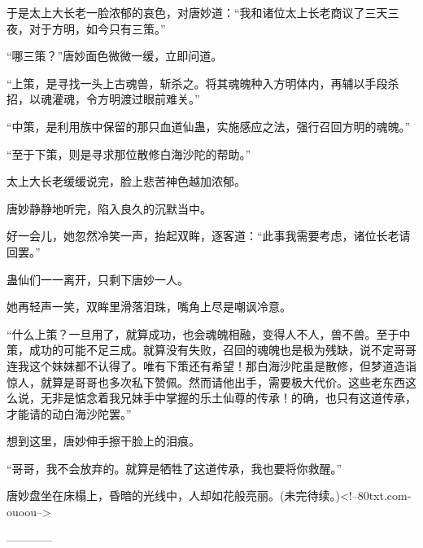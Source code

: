 \begin{this_body}
于是太上大长老一脸浓郁的哀色，对唐妙道：“我和诸位太上长老商议了三天三夜，对于方明，如今只有三策。”

“哪三策？”唐妙面色微微一缓，立即问道。

“上策，是寻找一头上古魂兽，斩杀之。将其魂魄种入方明体内，再辅以手段杀招，以魂灌魂，令方明渡过眼前难关。”

“中策，是利用族中保留的那只血道仙蛊，实施感应之法，强行召回方明的魂魄。”

“至于下策，则是寻求那位散修白海沙陀的帮助。”

太上大长老缓缓说完，脸上悲苦神色越加浓郁。

唐妙静静地听完，陷入良久的沉默当中。

好一会儿，她忽然冷笑一声，抬起双眸，逐客道：“此事我需要考虑，诸位长老请回罢。”

蛊仙们一一离开，只剩下唐妙一人。

她再轻声一笑，双眸里滑落泪珠，嘴角上尽是嘲讽冷意。

“什么上策？一旦用了，就算成功，也会魂魄相融，变得人不人，兽不兽。至于中策，成功的可能不足三成。就算没有失败，召回的魂魄也是极为残缺，说不定哥哥连我这个妹妹都不认得了。唯有下策还有希望！那白海沙陀虽是散修，但梦道造诣惊人，就算是哥哥也多次私下赞佩。然而请他出手，需要极大代价。这些老东西这么说，无非是惦念着我兄妹手中掌握的乐土仙尊的传承！的确，也只有这道传承，才能请的动白海沙陀罢。”

想到这里，唐妙伸手擦干脸上的泪痕。

“哥哥，我不会放弃的。就算是牺牲了这道传承，我也要将你救醒。”

唐妙盘坐在床榻上，昏暗的光线中，人却如花般亮丽。(未完待续。)<!--80txt.com-ouoou-->

------------

\end{this_body}

